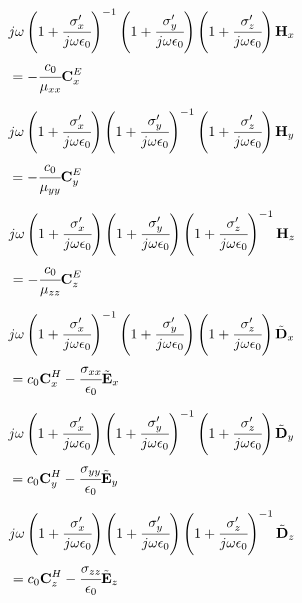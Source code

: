 \begin{small}

    \begin{align}
        &j\omega\pare{1 + \cfrac{\sigma_x\Prime}{j\omega\epsilon_0}}\inverse \pare{1 + \cfrac{\sigma_y\Prime}{j\omega\epsilon_0}}\pare{1 + \cfrac{\sigma_z\Prime}{j\omega\epsilon_0}} \Hh_x \nonumber \\
        &= -\cfrac{c_0}{\mu_{xx}}\CExw
        \label{eq:Hx_upml_freq}
    \end{align}

    \begin{align}
        &j\omega\pare{1 + \cfrac{\sigma_x\Prime}{j\omega\epsilon_0}} \pare{1 + \cfrac{\sigma_y\Prime}{j\omega\epsilon_0}}\inverse\pare{1 + \cfrac{\sigma_z\Prime}{j\omega\epsilon_0}} \Hh_y \nonumber \\
        &= -\cfrac{c_0}{\mu_{yy}}\CEyw
        \label{eq:Hy_upml_freq}
    \end{align}

    \begin{align}
        &j\omega\pare{1 + \cfrac{\sigma_x\Prime}{j\omega\epsilon_0}} \pare{1 + \cfrac{\sigma_y\Prime}{j\omega\epsilon_0}}\pare{1 + \cfrac{\sigma_z\Prime}{j\omega\epsilon_0}}\inverse \Hh_z \nonumber \\
        &= -\cfrac{c_0}{\mu_{zz}}\CEzw
        \label{eq:Hz_upml_freq}
    \end{align}

    \begin{align}
        &j\omega\pare{1 + \cfrac{\sigma_x\Prime}{j\omega\epsilon_0}}\inverse \pare{1 + \cfrac{\sigma_y\Prime}{j\omega\epsilon_0}}\pare{1 + \cfrac{\sigma_z\Prime}{j\omega\epsilon_0}} \Dnw_x \nonumber \\
        &= c_0\CHxw - \cfrac{\sigma_{xx}}{\epsilon_0}\Enw_x
        \label{eq:Ex_upml_freq}
    \end{align}

    \begin{align}
        &j\omega\pare{1 + \cfrac{\sigma_x\Prime}{j\omega\epsilon_0}} \pare{1 + \cfrac{\sigma_y\Prime}{j\omega\epsilon_0}}\inverse \pare{1 + \cfrac{\sigma_z\Prime}{j\omega\epsilon_0}} \Dnw_y \nonumber \\
        &= c_0\CHyw - \cfrac{\sigma_{yy}}{\epsilon_0}\Enw_y
        \label{eq:Ey_upml_freq}
    \end{align}

    \begin{align}
        &j\omega\pare{1 + \cfrac{\sigma_x\Prime}{j\omega\epsilon_0}} \pare{1 + \cfrac{\sigma_y\Prime}{j\omega\epsilon_0}} \pare{1 + \cfrac{\sigma_z\Prime}{j\omega\epsilon_0}}\inverse \Dnw_z \nonumber \\
        &= c_0\CHzw - \cfrac{\sigma_{zz}}{\epsilon_0}\Enw_z
        \label{eq:Ez_upml_freq}
    \end{align}


\end{small}
